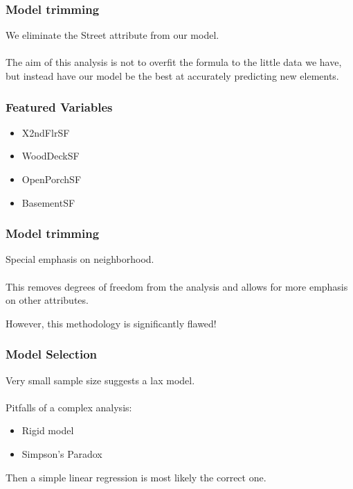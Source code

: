 \documentclass{beamer}
\begin{document}
\begin{frame}
\frametitle{Model trimming}

We eliminate the Street attribute from our model.\\~\\

The aim of this analysis is not to overfit the formula to the little data we have, but instead have our model be the best at accurately predicting new elements. 
\end{frame}

\begin{frame}
\frametitle{Featured Variables}
\begin{itemize}
\item X2ndFlrSF
\item WoodDeckSF
\item OpenPorchSF
\item BasementSF
\end{itemize}
\end{frame}

\begin{frame}
\frametitle{Model trimming}

Special emphasis on neighborhood.\\~\\

This removes degrees of freedom from the analysis and allows for more emphasis on other attributes.

However, this methodology is significantly flawed!
\end{frame}

\begin{frame}
\frametitle{Model Selection}

Very small sample size suggests a lax model.\\~\\

Pitfalls of a complex analysis:
\begin{itemize}
  \item Rigid model
  \item Simpson's Paradox
\end{itemize}
  
Then a simple linear regression is most likely the correct one.
\end{frame}
\end{document}
